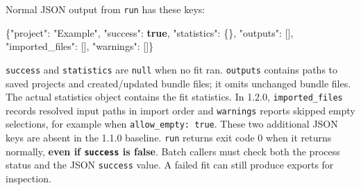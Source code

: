 \documentclass[
  10pt,
  a4paper,
  oneside]{scrreprt}
\newenvironment{Shaded}{}{}
\newcommand{\DataTypeTok}[1]{\textcolor[rgb]{0.56,0.13,0.00}{#1}}
\newcommand{\FunctionTok}[1]{\textcolor[rgb]{0.02,0.16,0.49}{#1}}
\newcommand{\KeywordTok}[1]{\textcolor[rgb]{0.00,0.44,0.13}{\textbf{#1}}}
\newcommand{\OtherTok}[1]{\textcolor[rgb]{0.00,0.44,0.13}{#1}}
\newcommand{\StringTok}[1]{\textcolor[rgb]{0.25,0.44,0.63}{#1}}
\begin{document}
Normal JSON output from \texttt{run} has these keys:

\begin{Shaded}
\begin{Highlighting}[]
\FunctionTok{\{}\DataTypeTok{"project"}\FunctionTok{:} \StringTok{"Example"}\FunctionTok{,} \DataTypeTok{"success"}\FunctionTok{:} \KeywordTok{true}\FunctionTok{,} \DataTypeTok{"statistics"}\FunctionTok{:} \FunctionTok{\{\},} \DataTypeTok{"outputs"}\FunctionTok{:} \OtherTok{[]}\FunctionTok{,}
 \DataTypeTok{"imported\_files"}\FunctionTok{:} \OtherTok{[]}\FunctionTok{,} \DataTypeTok{"warnings"}\FunctionTok{:} \OtherTok{[]}\FunctionTok{\}}
\end{Highlighting}
\end{Shaded}

\texttt{success} and \texttt{statistics} are \texttt{null} when no fit
ran. \texttt{outputs} contains paths to saved projects and
created/updated bundle files; it omits unchanged bundle files. The
actual statistics object contains the fit statistics. In 1.2.0,
\texttt{imported\_files} records resolved input paths in import order
and \texttt{warnings} reports skipped empty selections, for example when
\texttt{allow\_empty:\ true}. These two additional JSON keys are absent
in the 1.1.0 baseline. \texttt{run} returns exit code 0 when it returns
normally, \textbf{even if \texttt{success} is false}. Batch callers must
check both the process status and the JSON \texttt{success} value. A
failed fit can still produce exports for inspection.
\end{document}
